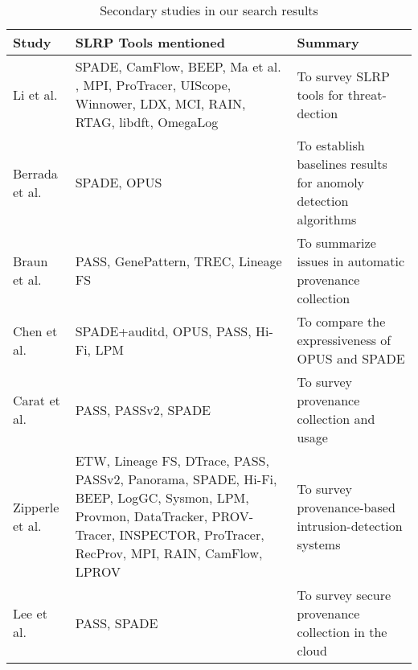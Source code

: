 \begin{table}
\caption{Secondary studies in our search results}
\label{table:secondary-studies}
\renewcommand{\arraystretch}{1.4}
\begin{tabular}{p{}p{}p{}}
Study                                       & SLRP Tools mentioned                              & Summary                                                         \\
\midrule
Li et al. \cite{li_threat_2021}             & SPADE, CamFlow, BEEP,
                                              Ma et al. \cite{ma_accurate_2015}, MPI, ProTracer,
                                              UIScope, Winnower, LDX, MCI, RAIN, RTAG, libdft,
                                              OmegaLog                                          & To survey SLRP tools for threat-dection                         \\
Berrada et al. \cite{berrada_baseline_2020} & SPADE, OPUS                                       & To establish baselines results for anomoly detection algorithms \\
Braun et al. \cite{hutchison_issues_2006}   & PASS, GenePattern, TREC, Lineage FS               & To summarize issues in automatic provenance collection          \\
Chen et al. \cite{chan_expressiveness_2017} & SPADE+auditd, OPUS, PASS, Hi-Fi, LPM              & To compare the expressiveness of OPUS and SPADE                 \\
Carat et al. \cite{carata_primer_2014}      & PASS, PASSv2, SPADE                               & To survey provenance collection and usage                       \\
Zipperle et al.
\cite{zipperle_provenance-based_2022}       & ETW, Lineage FS, DTrace, PASS, PASSv2, Panorama,
                                              SPADE, Hi-Fi, BEEP, LogGC, Sysmon, LPM, Provmon,
                                              DataTracker, PROV-Tracer, INSPECTOR, ProTracer,
                                              RecProv, MPI, RAIN, CamFlow, LPROV                & To survey provenance-based intrusion-detection systems          \\
Lee et al. \cite{lee_towards_2015}          & PASS, SPADE                                       & To survey secure provenance collection in the cloud             \\
\end{tabular}
\end{table}


